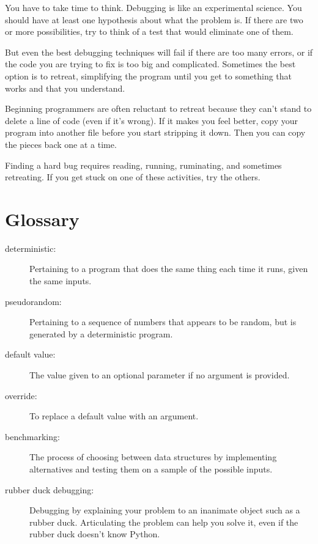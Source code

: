 \documentclass[10pt]{book}
\begin{document}
You have to take time to think.  Debugging is like an
experimental science.  You should have at least one hypothesis about
what the problem is.  If there are two or more possibilities, try to
think of a test that would eliminate one of them.

But even the best debugging techniques will fail if there are too many
errors, or if the code you are trying to fix is too big and
complicated.  Sometimes the best option is to retreat, simplifying the
program until you get to something that works and that you
understand.

Beginning programmers are often reluctant to retreat because
they can't stand to delete a line of code (even if it's wrong).
If it makes you feel better, copy your program into another file
before you start stripping it down.  Then you can copy the pieces
back one at a time.

Finding a hard bug requires reading, running, ruminating, and
sometimes retreating.  If you get stuck on one of these activities,
try the others.


\section{Glossary}

\begin{description}

\item[deterministic:] Pertaining to a program that does the same
thing each time it runs, given the same inputs.

\item[pseudorandom:] Pertaining to a sequence of numbers that appears
to be random, but is generated by a deterministic program.

\item[default value:] The value given to an optional parameter if no
argument is provided.

\item[override:] To replace a default value with an argument.

\item[benchmarking:] The process of choosing between data structures
by implementing alternatives and testing them on a sample of the
possible inputs.

\item[rubber duck debugging:] Debugging by explaining your problem
to an inanimate object such as a rubber duck.  Articulating the
problem can help you solve it, even if the rubber duck doesn't know
Python.

\end{description}
\end{document}
